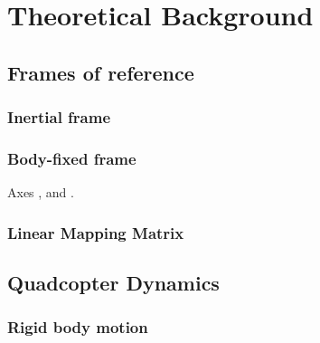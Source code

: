 \section{Theoretical Background}

\subsection{Frames of reference}
\subsubsection[Inertial frame]{Inertial frame }
\subsubsection[Body-fixed frame]{Body-fixed frame }
Axes ,  and .
\subsubsection[Linear Mapping Matrix]{Linear Mapping Matrix }
\label{sss:lmapmatQ}

\subsection{Quadcopter Dynamics}
\subsubsection{Rigid body motion}
\label{rigid-body-motion}